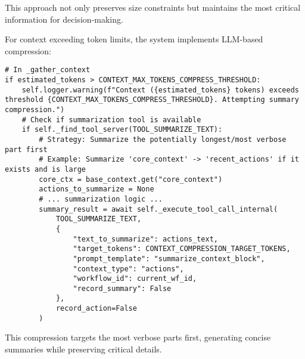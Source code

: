 \documentclass[12pt,a4paper]{article}
\begin{document}
This approach not only preserves size constraints but maintains the most critical information for decision-making.

For context exceeding token limits, the system implements LLM-based compression:
\begin{pageablecode}
\begin{verbatim}
# In _gather_context
if estimated_tokens > CONTEXT_MAX_TOKENS_COMPRESS_THRESHOLD:
    self.logger.warning(f"Context ({estimated_tokens} tokens) exceeds threshold {CONTEXT_MAX_TOKENS_COMPRESS_THRESHOLD}. Attempting summary compression.")
    # Check if summarization tool is available
    if self._find_tool_server(TOOL_SUMMARIZE_TEXT):
        # Strategy: Summarize the potentially longest/most verbose part first
        # Example: Summarize 'core_context' -> 'recent_actions' if it exists and is large
        core_ctx = base_context.get("core_context")
        actions_to_summarize = None
        # ... summarization logic ...
        summary_result = await self._execute_tool_call_internal(
            TOOL_SUMMARIZE_TEXT,
            {
                "text_to_summarize": actions_text,
                "target_tokens": CONTEXT_COMPRESSION_TARGET_TOKENS,
                "prompt_template": "summarize_context_block",
                "context_type": "actions",
                "workflow_id": current_wf_id,
                "record_summary": False
            },
            record_action=False
        )
\end{verbatim}
\end{pageablecode}
This compression targets the most verbose parts first, generating concise summaries while preserving critical details.
\end{document}
